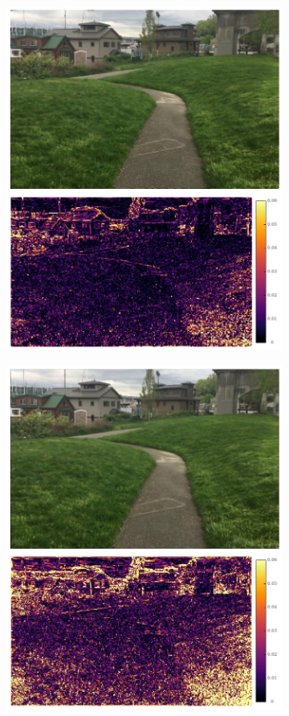 \documentclass{article}
\begin{document}
\begin{figure}[h]
\begin{subfigure}{0.125\textwidth}
    \includegraphics[width=1\linewidth]{qua_imgs/720p_240fps_1_bmbc.jpg}
\end{subfigure}%
\begin{subfigure}{0.125\textwidth}
	\centering
    \includegraphics[width=1\linewidth]{qua_imgs/720p_240fps_1_rrin.jpg}

\end{subfigure}
\end{figure}
\end{document}
